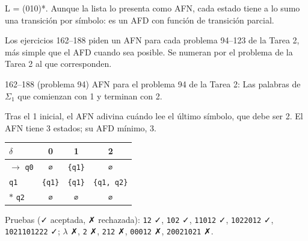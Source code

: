 \documentclass[11pt]{article}
\begin{document}
\resp L = (010)*. Aunque la lista lo presenta como AFN, cada estado tiene a lo sumo una transición por símbolo: es un AFD con función de transición parcial.


Los ejercicios 162--188 piden un AFN para cada problema 94--123 de la Tarea 2, más simple que el AFD cuando sea posible. Se numeran por el problema de la Tarea 2 al que corresponden.
\begin{ejercicio}{162--188 (problema 94)}{}
AFN para el problema 94 de la Tarea 2: Las palabras de $\Sigma_1$ que comienzan con 1 y terminan con 2.
\end{ejercicio}
\proc Tras el 1 inicial, el AFN adivina cuándo lee el último símbolo, que debe ser 2. El AFN tiene 3 estados; su AFD mínimo, 3.
\begin{center}\small\begin{tabular}{lccc}\toprule
$\delta$ & 0 & 1 & 2 \\\midrule
$\to$ \texttt{q0} & \texttt{∅} & \texttt{\{q1\}} & \texttt{∅} \\
 \texttt{q1} & \texttt{\{q1\}} & \texttt{\{q1\}} & \texttt{\{q1, q2\}} \\
$*$ \texttt{q2} & \texttt{∅} & \texttt{∅} & \texttt{∅} \\
\bottomrule\end{tabular}\end{center}
Pruebas (✓ aceptada, ✗ rechazada): \texttt{12} ✓, \texttt{102} ✓, \texttt{11012} ✓, \texttt{1022012} ✓, \texttt{1021101222} ✓; $\lambda$ ✗, \texttt{2} ✗, \texttt{212} ✗, \texttt{00012} ✗, \texttt{20021021} ✗.
\end{document}
